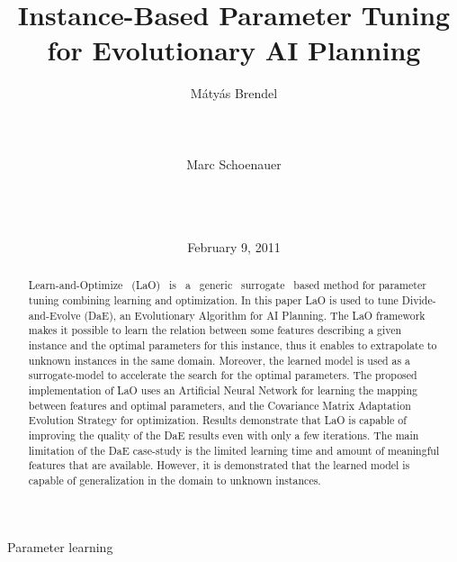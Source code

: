 \documentclass{MYsig-alternate}
\begin{document}
\title{Instance-Based Parameter Tuning\\
for Evolutionary AI Planning}


 
 \author{
 \alignauthor
 M{\'a}ty{\'a}s Brendel\\
        \\
        \\
        \\
 \alignauthor
 Marc Schoenauer\\
        \\
        \\
        \\
 }

\date{February 9, 2011}
\maketitle
\begin{abstract}
 \noindent Learn-and-Optimize ~(LaO) ~is ~a ~generic ~surrogate ~based method for parameter tuning combining learning and optimization. In this paper LaO is used to tune Divide-and-Evolve (DaE), an Evolutionary Algorithm for AI Planning. The LaO framework makes it possible to learn the relation between some features describing a given instance and the optimal parameters for this instance, thus it enables to extrapolate to unknown instances in the same domain. Moreover, the learned model is used as a surrogate-model to accelerate the search for the optimal parameters. The proposed implementation of LaO uses an Artificial Neural Network for learning the mapping between features and optimal parameters, and the Covariance Matrix Adaptation Evolution Strategy for optimization. Results demonstrate that LaO is capable of improving the quality of the DaE results even with only a few iterations. The main limitation of the DaE case-study is the limited learning time and amount of meaningful features that are available. However, it is demonstrated that the learned model is capable of generalization in the domain to unknown instances. 

\end{abstract}

 {Parameter learning}
\end{document}

